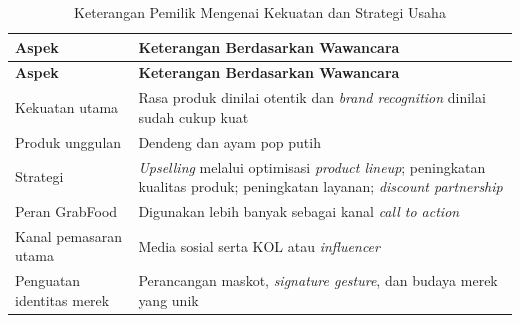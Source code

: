 \begingroup
\begin{xltabular}{\textwidth}{|Z{3.4cm}|Y|}
\caption{Keterangan Pemilik Mengenai Kekuatan dan Strategi Usaha}
\label{tab:kekuatan_strategi_wawancara} \\
        \toprule
        \textbf{Aspek}            & \textbf{Keterangan Berdasarkan Wawancara}                                                                                                      \\ \hline
        \midrule
\endfirsthead
{}
        \toprule
        \textbf{Aspek}            & \textbf{Keterangan Berdasarkan Wawancara}                                                                                                      \\ \hline
        \midrule
\endhead
{}
\endfoot
        \bottomrule
        \endlastfoot
        Kekuatan utama            & Rasa produk dinilai otentik dan \textit{brand recognition} dinilai sudah cukup kuat                                                            \\ \hline
        Produk unggulan           & Dendeng dan ayam pop putih                                                                                                                     \\ \hline
        Strategi                  & \textit{Upselling} melalui optimisasi \textit{product lineup}; peningkatan kualitas produk; peningkatan layanan; \textit{discount partnership} \\ \hline
        Peran GrabFood            & Digunakan lebih banyak sebagai kanal \textit{call to action}                                                                                   \\ \hline
        Kanal pemasaran utama     & Media sosial serta KOL atau \textit{influencer}                                                                                                \\ \hline
        Penguatan identitas merek & Perancangan maskot, \textit{signature gesture}, dan budaya merek yang unik                                                                     \\ \hline
        \bottomrule
    
\end{xltabular}
\endgroup

